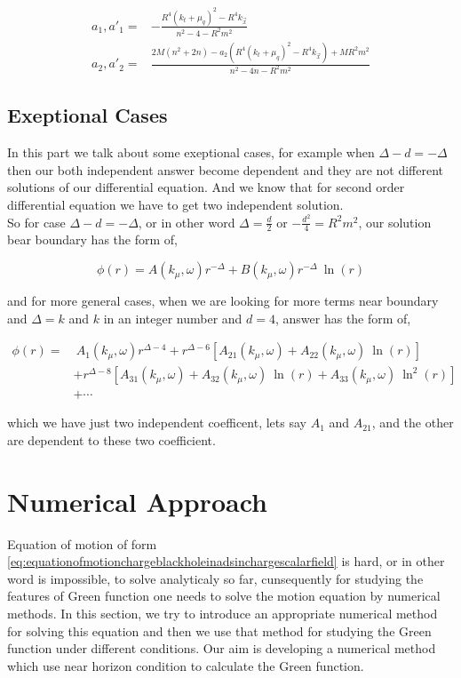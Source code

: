 \begin{align}
    a_1 , a'_1 =& -\frac{R^4(k_t+\mu_q)^2 - R^4k_{\vec{x}}}{n^2-4- R^2m^2}\nonumber\\
    a_2 , a'_2 =&  \frac{2M(n^2+2n)-a_2\left(R^4(k_t+\mu_q)^2 - R^4k_{\vec{x}}\right) + MR^2m^2}{n^2-4n - R^2m^2}
\end{align}


\subsection{Exeptional Cases}
In this part we talk about some exeptional cases, for example when $\Delta-d=-\Delta$ then our both independent answer become dependent and they are not different solutions of our differential equation. And we know that for second order differential equation we have to get two independent solution.\\

So for case $\Delta-d=-\Delta$, or in other word $\Delta = \frac{d}{2}$ or $-\frac{d^2}{4} = R^2m^2$, our solution bear boundary has the form of, 

\begin{equation}
   \phi(r) = A(k_{\mu},\omega)r^{-\Delta} + B(k_{\mu},\omega)r^{-\Delta}~\ln{(r)}
\end{equation}

and for more general cases, when we are looking for more terms near boundary and $\Delta=k$ and $k$ in an integer number and $d = 4$, answer has the form of,

\begin{align}
   \phi(r) =&~A_1(k_{\mu},\omega)r^{\Delta-4} + r^{\Delta-6}\left[A_{21}(k_{\mu},\omega) + A_{22}(k_{\mu},\omega)~\ln{(r)}\right] \nonumber\\
    &+ r^{\Delta-8}\left[A_{31}(k_{\mu},\omega) + A_{32}(k_{\mu},\omega)~\ln{(r)} + A_{33}(k_{\mu},\omega)~\ln^2{(r)}\right] \nonumber\\
    &+ \cdots 
\end{align}

which we have just two independent coefficent, lets say $A_1$ and $A_{21}$, and the other are dependent to these two coefficient.

\section{Numerical Approach}

Equation of motion of form \ref{eq:equationofmotionchargeblackholeinadsinchargescalarfield} is hard, or in other word is impossible, to solve analyticaly so far, cunsequently for studying the features of Green function one needs to solve the motion equation by numerical methods. In this section, we try to introduce an appropriate numerical method for solving this equation and then we use that method for studying the Green function under different conditions. Our aim is developing a numerical method which use near horizon condition to calculate the Green function.\\

